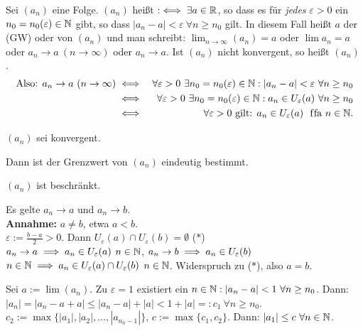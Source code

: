 \documentclass[a4paper,oneside,DIV15,BCOR12mm]{scrbook}
\begin{document}
\begin{definition}
Sei $(a_n)$ eine Folge. $(a_n)$ heißt  $:\iff \exists a \in \mathbb{R}$, so dass es für \textit{jedes} $\varepsilon > 0$ ein $n_0 = n_0(\varepsilon) \in \mathbb{N}$ gibt, so dass $|a_n - a| < \varepsilon \ \forall n \ge n_0$ gilt. In diesem Fall heißt $a$ der  (GW) oder  von $(a_n)$ und man schreibt: $\lim_{n \to \infty}(a_n) = a$ oder $\lim{a_n} = a$ oder $a_n \to a \ (n \to \infty)$ oder $a_n \to a$. Ist $(a_n)$ nicht konvergent, so heißt $(a_n)$ .
\begin{eqnarray*}
\text{Also: } a_n \to a \ (n \to \infty) 
  &\iff& \forall\varepsilon > 0 \ \exists n_0 = n_0(\varepsilon) \in\mathbb{N}: |a_n - a| < \varepsilon \ \forall n \ge n_0 \\
  &\iff& \forall\varepsilon > 0 \ \exists n_0 = n_0(\varepsilon) \in\mathbb{N}: a_n \in U_{\varepsilon}(a)\ \forall n \ge n_0 \\
  &\iff& \forall\varepsilon > 0 \text{ gilt: } a_n \in U_\varepsilon(a) \text{ \text{ f\/fa }} n \in \mathbb{N}.
\end{eqnarray*}
\end{definition}

\begin{satz}
$(a_n)$ sei konvergent.
\begin{liste}
\item Dann ist der Grenzwert von $(a_n)$ eindeutig bestimmt.
\item $(a_n)$ ist beschränkt.
\end{liste}
\end{satz}

\begin{beweise}
\item Es gelte $a_n \to a$ und $a_n \to b$. \\
\textbf{Annahme:} $a \ne b$, etwa $a < b$.\\
$\varepsilon := \frac{b-a}2 > 0$. Dann $U_\varepsilon(a) \cap U_\varepsilon(b) = \emptyset$ ($*$)\\
$a_n \to a \implies a_n \in U_\varepsilon(a) $ \ffa  $n \in \mathbb{N}$, $a_n \to b \implies a_n \in U_\varepsilon(b)$ \ffa $n \in \mathbb{N} \implies a_n \in U_\varepsilon(a) \cap U_\varepsilon(b)$ \ffa $n\in\mathbb{N}$. Widerspruch zu ($*$), also $a = b$.
\item Sei $a := \lim(a_n)$. Zu $\varepsilon = 1$ existiert ein $n\in\MdN: |a_n - a | < 1\ \forall n\ge n_0$. Dann: $|a_n| = |a_n - a + a| \le |a_n -a| + |a| < 1 + |a| =: c_1 \ \forall n \ge n_0$. $c_2 := \max\{|a_1|,|a_2|,\ldots,|a_{n_0-1}|\}$, $c := \max\{c_1,c_2\}$. Dann: $|a_1| \le c \ \forall n\in\mathbb{N}$.
\end{beweise}
\end{document}
